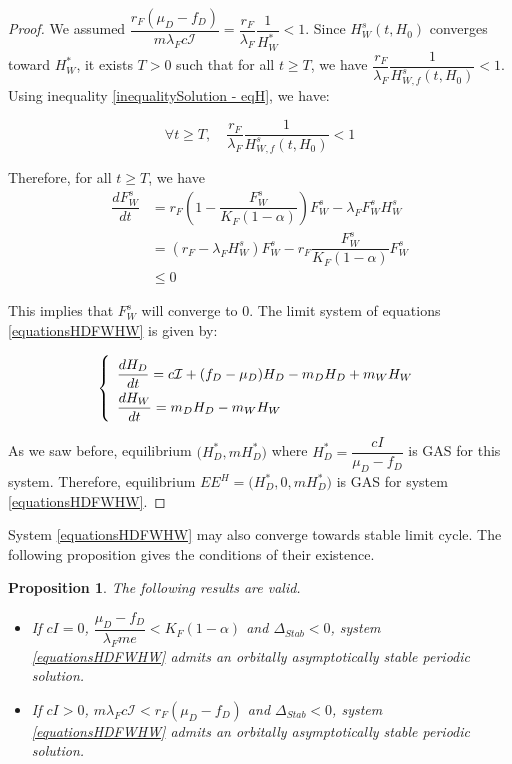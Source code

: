 \documentclass{article}
\newcommand{\lfw}{\lambda_{F}}
\newcommand{\lfw}{\lambda_{F}}
\newtheorem{prop}{Proposition}
\begin{document}
\begin{proof}
\medskip

We assumed $\dfrac{r_F(\mu_D-f_D)}{m\lfw c\mathcal{I}} = \dfrac{r_F}{\lfw}\dfrac{1}{H_W^*} < 1$. Since $H_W^s(t, H_0)$ converges toward $H_W^*$, it exists $T > 0$ such that for all $t \geq T$, we have $\dfrac{r_F}{\lfw}\dfrac{1}{H_{W, f}^s(t, H_0)} < 1$. Using inequality \eqref{inequalitySolution - eqH}, we have:

\begin{equation}
\forall t \geq T, \quad \dfrac{r_F}{\lfw}\dfrac{1}{H_{W, f}^s(t, H_0)} < 1
\end{equation}

\medskip
Therefore, for all $t \geq T$, we have
\begin{align*}
\dfrac{dF_W^s}{dt} &= r_F \left(1 - \dfrac{F_W^s}{K_F(1-\alpha)} \right) F_W^s - \lfw F_W^s H_W^s \\
&= \left(r_F- \lfw H_W^s\right) F_W^s - r_F \dfrac{F_W^s}{K_F(1-\alpha)}F_W^s \\
& \leq 0
\end{align*}

This implies that $F_W^s$ will converge to 0. The limit system of equations \eqref{equationsHDFWHW} is given by:

\begin{equation}
\def\arraystretch{2}
\left\{ \begin{array}{l}
\dfrac{dH_D}{dt}= c\mathcal{I} + (f_D - \mu_D) H_D - m_D H_D + m_W H_W  \\
\dfrac{dH_W}{dt}= m_D H_D - m_W H_W
\end{array}\right.
\end{equation}

As we saw before, equilibrium $\Big(H_D^*, mH_D^*\Big)$ where $H_D^* = \dfrac{cI}{\mu_D - f_D}$ is GAS for this system. Therefore, equilibrium $EE^{H} = \Big(H_D^*, 0, mH_D^*\Big)$ is GAS for system \eqref{equationsHDFWHW}.

\end{proof}

System \eqref{equationsHDFWHW} may also converge towards stable limit cycle. The following proposition gives the conditions of their existence.

\begin{prop} The following results are valid.
\begin{itemize}
\item If $cI = 0$, $\dfrac{\mu_D - f_D}{\lfw m e}< K_F(1-\alpha)$ and $\Delta_{Stab} < 0$, system \eqref{equationsHDFWHW} admits an orbitally asymptotically stable periodic solution.
\item If $cI > 0$, $m \lfw c\mathcal{I}< r_F (\mu_D -f_D)$ and $\Delta_{Stab} < 0$, system \eqref{equationsHDFWHW} admits an orbitally asymptotically stable periodic solution.
\end{itemize}
\end{prop}
\end{document}
